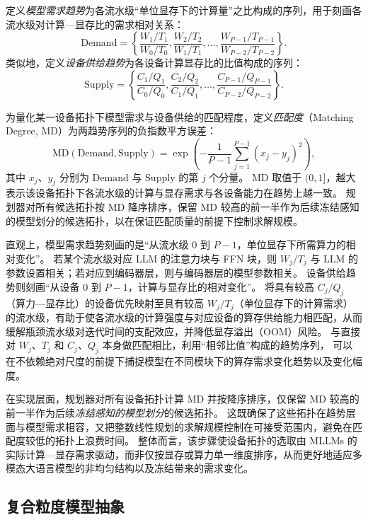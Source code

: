 定义\emph{模型需求趋势}为各流水级“单位显存下的计算量”之比构成的序列，用于刻画各流水级对计算—显存比的需求相对关系：
\begin{equation}
  \mathrm{Demand} = \left\{ \frac{W_1/T_1}{W_0/T_0}, \frac{W_2/T_2}{W_1/T_1}, \ldots, \frac{W_{P-1}/T_{P-1}}{W_{P-2}/T_{P-2}} \right\}.
\end{equation}
类似地，定义\emph{设备供给趋势}为各设备计算显存比的比值构成的序列：
\begin{equation}
  \mathrm{Supply} = \left\{ \frac{C_1/Q_1}{C_0/Q_0}, \frac{C_2/Q_2}{C_1/Q_1}, \ldots, \frac{C_{P-1}/Q_{P-1}}{C_{P-2}/Q_{P-2}} \right\}.
\end{equation}


为量化某一设备拓扑下模型需求与设备供给的匹配程度，定义\emph{匹配度}（Matching Degree, MD）为两趋势序列的负指数平方误差：
\begin{equation}
  \mathrm{MD}(\mathrm{Demand}, \mathrm{Supply}) = \exp\left( -\frac{1}{P-1} \sum_{j=1}^{P-1} (x_j - y_j)^2 \right),
\end{equation}
其中 $x_j$、$y_j$ 分别为 $\mathrm{Demand}$ 与 $\mathrm{Supply}$ 的第 $j$ 个分量。
MD 取值于 $(0, 1]$，越大表示该设备拓扑下各流水级的计算与显存需求与各设备能力在趋势上越一致。
规划器对所有候选拓扑按 MD 降序排序，保留 MD 较高的前一半作为后续冻结感知的模型划分的候选拓扑，以在保证匹配质量的前提下控制求解规模。

直观上，模型需求趋势刻画的是“从流水级 0 到 $P-1$，单位显存下所需算力的相对变化”。
若某个流水级对应 LLM 的注意力块与 FFN 块，则 $W_j/T_j$ 与 LLM 的参数设置相关；若对应到编码器层，则与编码器层的模型参数相关。
设备供给趋势则刻画“从设备 0 到 $P-1$，计算与显存比的相对变化”。
将具有较高 $C_j/Q_j$（算力—显存比）的设备优先映射至具有较高 $W_j/T_j$（单位显存下的计算需求）的流水级，有助于使各流水级的计算强度与对应设备的算存供给能力相匹配，从而缓解瓶颈流水级对迭代时间的支配效应，并降低显存溢出（OOM）风险。
与直接对 $W_j$、$T_j$ 和 $C_j$、$Q_j$ 本身做匹配相比，利用“相邻比值”构成的趋势序列，
可以在不依赖绝对尺度的前提下捕捉模型在不同模块下的算存需求变化趋势以及变化幅度。

在实现层面，规划器对所有设备拓扑计算 MD 并按降序排序，仅保留 MD 较高的前一半作为后续\emph{冻结感知的模型划分}的候选拓扑。
这既确保了这些拓扑在趋势层面与模型需求相容，又把整数线性规划的求解规模控制在可接受范围内，避免在匹配度较低的拓扑上浪费时间。
整体而言，该步骤使设备拓扑的选取由 MLLMs 的实际计算—显存需求驱动，而非仅按显存或算力单一维度排序，从而更好地适应多模态大语言模型的非均匀结构以及冻结带来的需求变化。

\subsection{复合粒度模型抽象}

